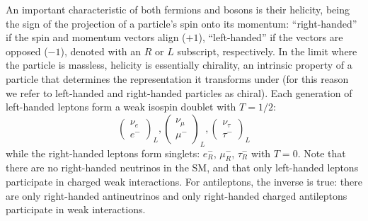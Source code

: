 An important characteristic of both fermions and bosons is their helicity, being the sign of the projection of a particle's spin onto its momentum: ``right-handed'' if the spin and momentum vectors align ($+1$), ``left-handed'' if the vectors are opposed ($-1$), denoted with an $R$ or $L$ subscript, respectively. In the limit where the particle is massless, helicity is essentially chirality, an intrinsic property of a particle that determines the representation it transforms under (for this reason we refer to left-handed and right-handed particles as chiral). Each generation of left-handed leptons form a weak isospin doublet with $T=1/2$:
\begin{equation}
    \left(\begin{array}{c}
        \nu_e \\
        e^-
    \end{array}\right)_L,
    \left(\begin{array}{c}
        \nu_{\mu} \\
        \mu^-
    \end{array}\right)_L,
    \left(\begin{array}{c}
        \nu_{\tau} \\
        \tau^-
    \end{array}\right)_L
\end{equation} 
while the right-handed leptons form singlets: $e^-_R$, $\mu^-_R$, $\tau^-_R$ with $T=0$. Note that there are no right-handed neutrinos in the SM, and that only left-handed leptons participate in charged weak interactions. For antileptons, the inverse is true: there are only right-handed antineutrinos and only right-handed charged antileptons participate in weak interactions.

